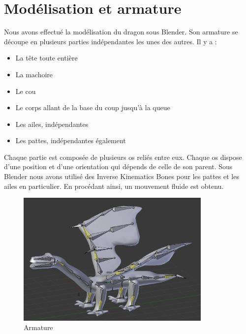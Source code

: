 \documentclass[a4paper]{report}
\begin{document}
\newpage
\chapter{Modélisation et armature}
\par
Nous avons effectué la modélisation du dragon sous Blender. Son armature se découpe en plusieurs parties indépendantes les unes des autres. Il y a :
\begin{itemize}
\item La tête toute entière
\item La machoire
\item Le cou
\item Le corps allant de la base du coup jusqu'à la queue
\item Les ailes, indépendantes
\item Les pattes, indépendantes également
\end{itemize}

Chaque partie est composée de plusieurs os reliés entre eux. Chaque os dispose d'une position et d'une orientation qui dépends de celle de son parent. Sous Blender nous avons utilisé des Inverse Kinematics Bones pour les pattes et les ailes en particulier. En procédant ainsi, un mouvement fluide est obtenu.

\begin{figure}[H]
    \begin{center}
        \includegraphics[width=0.85\textwidth]{armature.png}
        \caption{Armature}
    \end{center}
\end{figure}
\newpage
\end{document}
